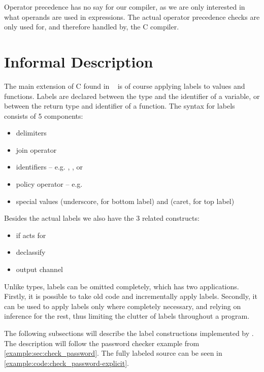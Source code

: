 Operator precedence has no say for our compiler, as we are only interested in what operands are used in expressions.
The actual operator precedence checks are only used for, and therefore handled by, the C compiler.

\section{Informal Description}
The main extension of C found in \thelang~ is of course applying labels to values and functions.
Labels are declared between the type and the identifier of a variable, or between the return type and identifier of a function.
The syntax for labels consists of 5 components:
\begin{itemize}
  \item delimiters \dlmc{\{\{ \}\}}
  \item join operator \dlmc{;}
  \item identifiers -- e.g. , , or 
  \item policy operator \dlmc{->} -- e.g. 
  \item special values \dlmc{_} (underscore, for bottom label) and \dlmc{^} (caret, for top label)
\end{itemize}

Besides the actual labels we also have the 3 related constructs:
\begin{itemize}
  \item if acts for 
  \item declassify 
  \item output channel 
\end{itemize}

Unlike types, labels can be omitted completely, which has two applications.
Firstly, it is possible to take old code and incrementally apply labels.
Secondly, it can be used to apply labels only where completely necessary, and relying on inference for the rest, thus limiting the clutter of labels throughout a program.

The following subsections will describe the label constructions implemented by \thelang.
The description will follow the password checker example from \cref{example:sec:check_password}.
The fully labeled source can be seen in \cref{example:code:check_password-explicit}.



